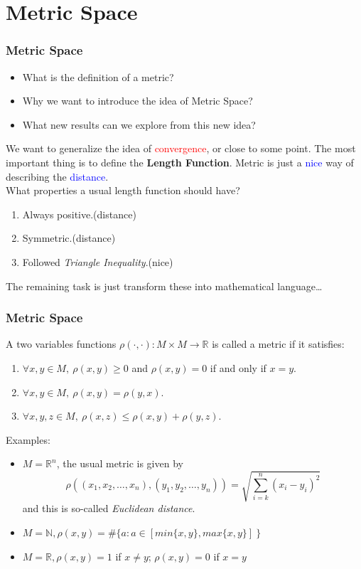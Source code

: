 \documentclass{beamer}
\begin{document}
\section{Metric Space}
\begin{frame}
    \frametitle{Metric Space}
\begin{itemize}
    \item What is the definition of a metric?
    \item Why we want to introduce the idea of Metric Space?
    \item What new results can we explore from this new idea?
\end{itemize}
We want to generalize the idea of \textcolor{red}{convergence}, or close to some point. 
The most important thing is to define 
 the \textbf{Length Function}. Metric is just a \textcolor{blue}{nice} way of describing the 
 \textcolor{blue}{distance}.\\

\vspace{1em}
What properties a usual length function should have?
\begin{enumerate}
    \item Always positive.(distance)
    \item Symmetric.(distance)
    \item Followed \emph{Triangle Inequality}.(nice)
\end{enumerate}
\vspace{0.5em}
The remaining task is just 
transform these into mathematical language\dots
\end{frame}
\begin{frame}
    \frametitle{Metric Space}
A two variables functions 
$\rho(\cdot,\cdot):M\times M \rightarrow \mathbb{R}$
is called a metric if it satisfies:
\begin{enumerate}
    \item $\forall x,y\in M,\ \rho (x,y) \geq 0$ and $\rho (x,y)=0$ if and only if $x=y$.
    \item  $\forall x,y\in M,\ \rho (x,y)=\rho (y,x)$.
    \item  $\forall x,y,z\in M,\ \rho (x,z)\leq \rho (x,y)+\rho (y,z)$.
\end{enumerate}
\pause
Examples:
\begin{itemize}
    \item $M=\mathbb{R}^n$, the usual metric is given by 
        \begin{equation*}
            \rho ( (x_1,x_2,\dots,x_n), (y_1,y_2,\dots,y_n)) = \sqrt{\sum^{n}_{i=k}(x_i-y_i)^2 }
        \end{equation*} 
        and this is so-called \emph{Euclidean distance}.
    \item $M=\mathbb{N}, \rho(x,y)= \#\{ a:a\in [min\{x,y\},max\{x,y\}]\ \} $
    \item $M=\mathbb{R},\rho (x,y)=1 $ if $x\neq y$; $\rho (x,y)=0$ if $x=y$
\end{itemize}
\end{frame}
\end{document}
